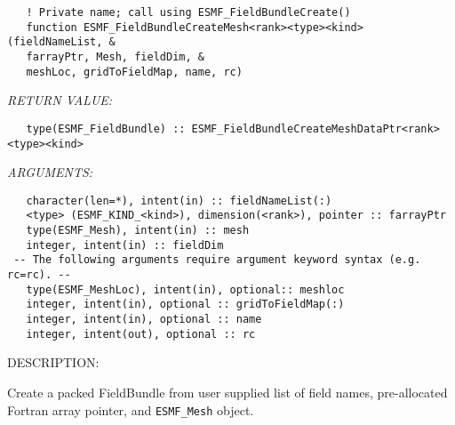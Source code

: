    
\begin{verbatim}   ! Private name; call using ESMF_FieldBundleCreate() 
   function ESMF_FieldBundleCreateMesh<rank><type><kind>(fieldNameList, & 
   farrayPtr, Mesh, fieldDim, & 
   meshLoc, gridToFieldMap, name, rc) 
   \end{verbatim}{\em RETURN VALUE:}
\begin{verbatim}   type(ESMF_FieldBundle) :: ESMF_FieldBundleCreateMeshDataPtr<rank><type><kind> 
   \end{verbatim}{\em ARGUMENTS:}
\begin{verbatim}   character(len=*), intent(in) :: fieldNameList(:) 
   <type> (ESMF_KIND_<kind>), dimension(<rank>), pointer :: farrayPtr 
   type(ESMF_Mesh), intent(in) :: mesh 
   integer, intent(in) :: fieldDim 
 -- The following arguments require argument keyword syntax (e.g. rc=rc). --
   type(ESMF_MeshLoc), intent(in), optional:: meshloc 
   integer, intent(in), optional :: gridToFieldMap(:) 
   integer, intent(in), optional :: name 
   integer, intent(out), optional :: rc 
   \end{verbatim}
{\sf DESCRIPTION:\\ }

 
   Create a packed FieldBundle from user supplied list of field names, pre-allocated 
   Fortran array pointer, and {\tt ESMF\_Mesh} object. 
   
